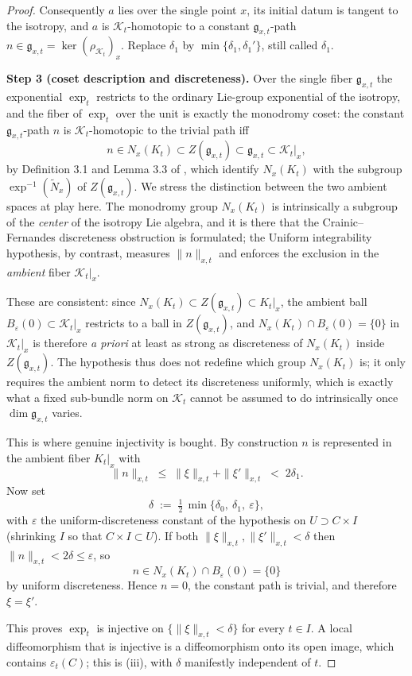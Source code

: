 \documentclass[reqno]{amsart}
\theoremstyle{plain}
\theoremstyle{definition}
\newcommand{\Kt}{K_t}
\newcommand{\Nx}{N_x(\Kt)}
\newcommand{\K}{\mathcal{K}}
\begin{document}
\begin{proof}
Consequently $a$ lies over the single point $x$, its initial datum is tangent to the isotropy, and $a$ is $\K_t$-homotopic to a constant $\mathfrak{g}_{x,t}$-path $n \in \mathfrak{g}_{x,t}=\ker(\rho_{\K_t})_x$. Replace $\delta_1$ by
$\min\{\delta_1,\delta_1'\}$, still called $\delta_1$.

\smallskip
\noindent\textbf{Step 3 (coset description and discreteness).}
Over the single fiber $\mathfrak{g}_{x,t}$ the exponential $\exp_t$ restricts to the ordinary Lie-group exponential of the isotropy, and the fiber of $\exp_t$ over the unit is exactly the monodromy coset: the constant
$\mathfrak{g}_{x,t}$-path $n$ is $\K_t$-homotopic to the trivial path iff
\[
  n \in \Nx \subset Z(\mathfrak{g}_{x,t}) \subset \mathfrak{g}_{x,t}
      \subset \K_t|_x ,
\]
by Definition 3.1 and Lemma 3.3 of \cite{crainic2003integrability}, which identify $\Nx$ with the
subgroup $\exp^{-1}(\widetilde N_x)$ of $Z(\mathfrak{g}_{x,t})$. We stress the distinction between the two ambient spaces at play here. The monodromy group $\Nx$ is intrinsically a subgroup of the \emph{center} of the isotropy Lie algebra, and it is there that the Crainic--Fernandes discreteness obstruction
is formulated; the Uniform integrability hypothesis, by contrast, measures $\|n\|_{x,t}$ and enforces the exclusion in the \emph{ambient} fiber $\K_t|_x$.

These are consistent: since $\Nx\subset Z(\mathfrak{g}_{x,t})\subset\Kt|_x$, the
ambient ball $B_\varepsilon(0)\subset\K_t|_x$ restricts to a ball in $Z(\mathfrak{g}_{x,t})$, and $\Nx\cap B_\varepsilon(0)=\{0\}$ in $\K_t|_x$ is therefore \emph{a priori} at least as strong as discreteness of $\Nx$ inside
$Z(\mathfrak{g}_{x,t})$. The hypothesis thus does not redefine which group $\Nx$ is; it only requires the ambient norm to detect its discreteness uniformly, which is exactly what a fixed sub-bundle norm on $\K_t$ cannot be assumed to do intrinsically once $\dim\mathfrak{g}_{x,t}$ varies.

This is where genuine injectivity is bought. By construction $n$ is
represented in the ambient fiber $\Kt|_x$ with
\[
  \|n\|_{x,t} \;\le\; \|\xi\|_{x,t} + \|\xi'\|_{x,t} \;<\; 2\delta_1 .
\]
Now set
\[
  \delta \;:=\; \tfrac12\,\min\{\delta_0,\ \delta_1,\ \varepsilon\},
\]
with $\varepsilon$ the uniform-discreteness constant of the hypothesis on
$U \supset C\times I$ (shrinking $I$ so that $C\times I\subset U$). If both
$\|\xi\|_{x,t},\|\xi'\|_{x,t} < \delta$ then $\|n\|_{x,t} < 2\delta \le
\varepsilon$, so
\[
  n \in \Nx \cap B_\varepsilon(0) = \{0\}
\]
by uniform discreteness. Hence $n=0$, the constant path is trivial, and therefore $\xi=\xi'$.

\smallskip
This proves $\exp_t$ is injective on $\{\|\xi\|_{x,t}<\delta\}$ for every $t\in I$. A local diffeomorphism that is injective is a diffeomorphism onto its open image, which contains $\varepsilon_t(C)$; this is (iii), with $\delta$ manifestly independent of $t$.
\end{proof}
\end{document}
